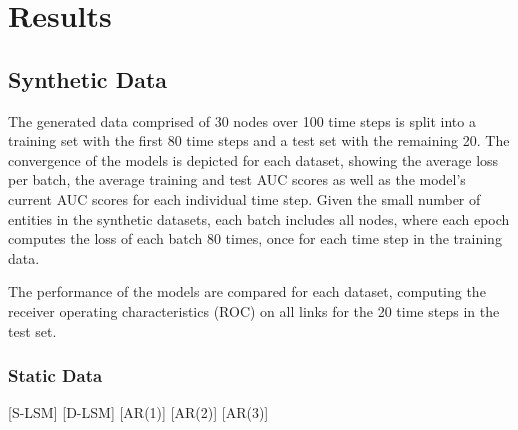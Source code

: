 \chapter{Results}\label{ch:Results}

\section{Synthetic Data}

The generated data comprised of 30 nodes over 100 time steps is split into a training set with the first 80 time steps and a test set with the remaining 20. 
The convergence of the models is depicted for each dataset, showing the average loss per batch, the average training and test AUC scores as well as the model's current AUC scores for each individual time step. 
Given the small number of entities in the synthetic datasets, each batch includes all nodes, where each epoch computes the loss of each batch 80 times, once for each time step in the training data. 


The performance of the models are compared for each dataset, computing the receiver operating characteristics (ROC) on all links for the 20 time steps in the test set.

\subsection{Static Data}

    
    {[S-LSM]}
    {[D-LSM]}
    {[AR(1)]}
    {[AR(2)]}
    {[AR(3)]}


